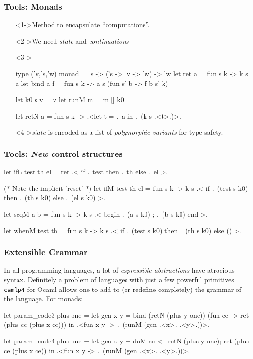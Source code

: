 \documentclass{beamer}
\begin{document}
\begin{frame}[fragile]
    \frametitle{Tools: Monads}
    \begin{itemize}
        \item[]<1->Method to encapsulate ``computations''.
        \item[]<2->We need \emph{state} and \emph{continuations}
        \item[]<3->
\begin{code}
type ('v,'s,'w) monad = 's -> ('s -> 'v -> 'w) -> 'w
let ret a = fun s k -> k s a
let bind a f = fun s k -> a s (fun s' b -> f b s' k)

let k0 s v = v
let runM m = m [] k0

let retN a = fun s k -> .<let t = .~a in .~(k s .<t>.)>.
\end{code}
\item[]<4->\textit{state} is encoded as a list of
    \emph{polymorphic variants} for type-safety.
    \end{itemize}
\end{frame}

\begin{frame}[fragile]
    \frametitle{Tools: \textit{New} control structures}
\begin{code}
let ifL test th el = ret .< if .~test then .~th else .~el >.

(* Note the implicit `reset` *)
let ifM test th el = fun s k -> k s
  .< if .~(test s k0) then .~(th s k0) else .~(el s k0) >.

let seqM a b = fun s k -> k s 
  .< begin .~(a s k0) ; .~(b s k0) end >.

let whenM test th  = fun s k -> k s 
  .< if .~(test s k0) then .~(th s k0) else () >.
\end{code}
\end{frame}

\begin{frame}[fragile]
    \frametitle{Extensible Grammar}
    In all programming languages, a lot of \emph{expressible abstractions}
    have atrocious syntax.  Definitely a problem of languages with
    just a few powerful primitives. \texttt{camlp4} for Ocaml allows one to add
    to (or redefine completely) the grammar of the language.  For monads:
\begin{code}
let param_code3 plus one =
  let gen x y = bind (retN (plus y one)) (fun ce -> 
                ret (plus ce (plus x ce)))
  in .<fun x y -> .~(runM (gen .<x>. .<y>.))>.

let param_code4 plus one =
  let gen x y = doM ce <-- retN (plus y one);
                    ret (plus ce (plus x ce))
  in .<fun x y -> .~(runM (gen .<x>. .<y>.))>.
\end{code}
\end{frame}
\end{document}
